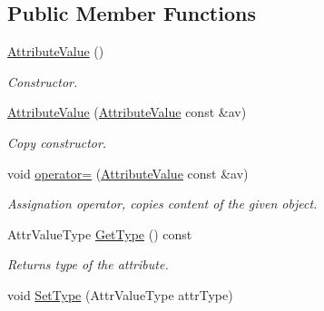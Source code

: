\subsection*{Public Member Functions}
\begin{DoxyCompactItemize}
\item 
\hypertarget{class_common_1_1_attribute_value_a85fc10d30887464438324f511e415e04}{\hyperlink{class_common_1_1_attribute_value_a85fc10d30887464438324f511e415e04}{Attribute\-Value} ()}\label{class_common_1_1_attribute_value_a85fc10d30887464438324f511e415e04}

\begin{DoxyCompactList}\small\item\em Constructor. \end{DoxyCompactList}\item 
\hypertarget{class_common_1_1_attribute_value_aca5adecb66fd562acd287986fd52e78d}{\hyperlink{class_common_1_1_attribute_value_aca5adecb66fd562acd287986fd52e78d}{Attribute\-Value} (\hyperlink{class_common_1_1_attribute_value}{Attribute\-Value} const \&av)}\label{class_common_1_1_attribute_value_aca5adecb66fd562acd287986fd52e78d}

\begin{DoxyCompactList}\small\item\em Copy constructor. \end{DoxyCompactList}\item 
\hypertarget{class_common_1_1_attribute_value_acc398a13933363ebf35f0871fa70ed53}{void \hyperlink{class_common_1_1_attribute_value_acc398a13933363ebf35f0871fa70ed53}{operator=} (\hyperlink{class_common_1_1_attribute_value}{Attribute\-Value} const \&av)}\label{class_common_1_1_attribute_value_acc398a13933363ebf35f0871fa70ed53}

\begin{DoxyCompactList}\small\item\em Assignation operator, copies content of the given object. \end{DoxyCompactList}\item 
\hypertarget{class_common_1_1_attribute_value_a5a1f75aa6614c5c66e068d4e504c5811}{Attr\-Value\-Type \hyperlink{class_common_1_1_attribute_value_a5a1f75aa6614c5c66e068d4e504c5811}{Get\-Type} () const }\label{class_common_1_1_attribute_value_a5a1f75aa6614c5c66e068d4e504c5811}

\begin{DoxyCompactList}\small\item\em Returns type of the attribute. \end{DoxyCompactList}\item 
\hypertarget{class_common_1_1_attribute_value_a0891619e861ce488d2633479c60513e7}{void \hyperlink{class_common_1_1_attribute_value_a0891619e861ce488d2633479c60513e7}{Set\-Type} (Attr\-Value\-Type attr\-Type)}\label{class_common_1_1_attribute_value_a0891619e861ce488d2633479c60513e7}


\end{DoxyCompactItemize}
